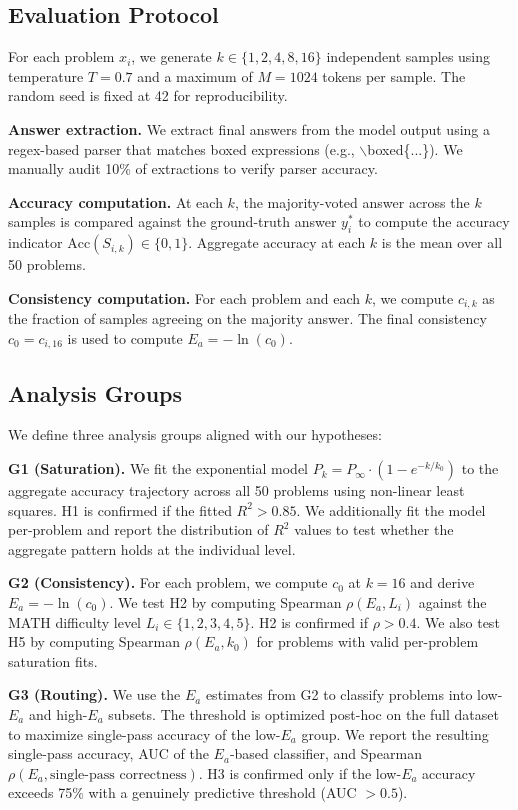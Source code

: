 \documentclass{article}
\begin{document}
\subsection{Evaluation Protocol}

For each problem $x_i$, we generate $k \in \{1, 2, 4, 8, 16\}$ independent samples using temperature $T = 0.7$ and a maximum of $M = 1024$ tokens per sample. The random seed is fixed at 42 for reproducibility.

\textbf{Answer extraction.} We extract final answers from the model output using a regex-based parser that matches boxed expressions (e.g., $\backslash$boxed\{...\}). We manually audit 10\% of extractions to verify parser accuracy.

\textbf{Accuracy computation.} At each $k$, the majority-voted answer across the $k$ samples is compared against the ground-truth answer $y_i^*$ to compute the accuracy indicator $\text{Acc}(S_{i,k}) \in \{0, 1\}$. Aggregate accuracy at each $k$ is the mean over all 50 problems.

\textbf{Consistency computation.} For each problem and each $k$, we compute $c_{i,k}$ as the fraction of samples agreeing on the majority answer. The final consistency $c_0 = c_{i,16}$ is used to compute $E_a = -\ln(c_0)$.

\subsection{Analysis Groups}

We define three analysis groups aligned with our hypotheses:

\textbf{G1 (Saturation).} We fit the exponential model $P_k = P_\infty \cdot (1 - e^{-k/k_0})$ to the aggregate accuracy trajectory across all 50 problems using non-linear least squares. H1 is confirmed if the fitted $R^2 > 0.85$. We additionally fit the model per-problem and report the distribution of $R^2$ values to test whether the aggregate pattern holds at the individual level.

\textbf{G2 (Consistency).} For each problem, we compute $c_0$ at $k = 16$ and derive $E_a = -\ln(c_0)$. We test H2 by computing Spearman $\rho(E_a, L_i)$ against the MATH difficulty level $L_i \in \{1, 2, 3, 4, 5\}$. H2 is confirmed if $\rho > 0.4$. We also test H5 by computing Spearman $\rho(E_a, k_0)$ for problems with valid per-problem saturation fits.

\textbf{G3 (Routing).} We use the $E_a$ estimates from G2 to classify problems into low-$E_a$ and high-$E_a$ subsets. The threshold is optimized post-hoc on the full dataset to maximize single-pass accuracy of the low-$E_a$ group. We report the resulting single-pass accuracy, AUC of the $E_a$-based classifier, and Spearman $\rho(E_a, \text{single-pass correctness})$. H3 is confirmed only if the low-$E_a$ accuracy exceeds 75\% with a genuinely predictive threshold (AUC $> 0.5$).
\end{document}
